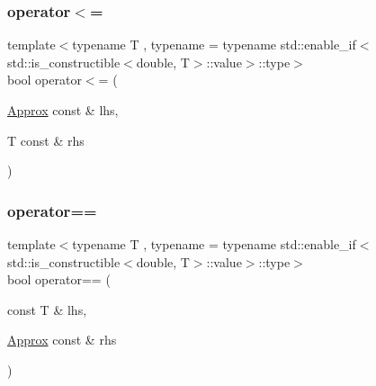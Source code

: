\subsubsection{\texorpdfstring{operator$<$=}{operator<=}\hspace{0.1cm}{\footnotesize\ttfamily [2/2]}}
{\footnotesize\ttfamily template$<$typename T , typename  = typename std\+::enable\+\_\+if$<$std\+::is\+\_\+constructible$<$double, T$>$\+::value$>$\+::type$>$ \\
bool operator$<$= (\begin{DoxyParamCaption}\item[{\mbox{\hyperlink{class_catch_1_1_detail_1_1_approx}{Approx}} const \&}]{lhs,  }\item[{T const \&}]{rhs }\end{DoxyParamCaption})\hspace{0.3cm}{\ttfamily [friend]}}

\mbox{\label{class_catch_1_1_detail_1_1_approx_ab38782a37d09b527ca5e126dbf433dda}} 
\subsubsection{\texorpdfstring{operator==}{operator==}\hspace{0.1cm}{\footnotesize\ttfamily [1/2]}}
{\footnotesize\ttfamily template$<$typename T , typename  = typename std\+::enable\+\_\+if$<$std\+::is\+\_\+constructible$<$double, T$>$\+::value$>$\+::type$>$ \\
bool operator== (\begin{DoxyParamCaption}\item[{const T \&}]{lhs,  }\item[{\mbox{\hyperlink{class_catch_1_1_detail_1_1_approx}{Approx}} const \&}]{rhs }\end{DoxyParamCaption})\hspace{0.3cm}{\ttfamily [friend]}}

\mbox{\label{class_catch_1_1_detail_1_1_approx_a0e5ef1957d4c38d7857005909c613743}} 
